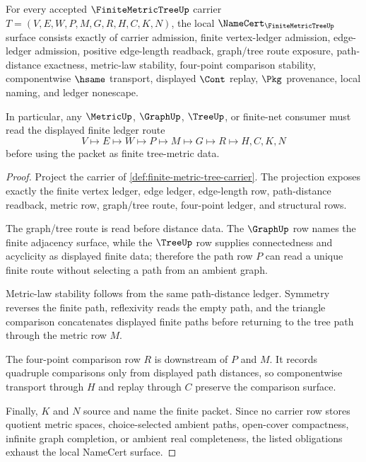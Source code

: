 \begin{theorem}
\label{thm:finite-metric-tree-namecert-obligations}
For every accepted $\FiniteMetricTreeUp$ carrier $T=(V,E,W,P,M,G,R,H,C,K,N)$, the local $\NameCert_{\FiniteMetricTreeUp}$ surface consists exactly of carrier admission, finite vertex-ledger admission, edge-ledger admission, positive edge-length readback, graph/tree route exposure, path-distance exactness, metric-law stability, four-point comparison stability, componentwise $\hsame$ transport, displayed $\Cont$ replay, $\Pkg$ provenance, local naming, and ledger nonescape.

In particular, any $\MetricUp$, $\GraphUp$, $\TreeUp$, or finite-net consumer must read the displayed finite ledger route
$$
V\longmapsto E\longmapsto W\longmapsto P\longmapsto M\longmapsto G\longmapsto R\longmapsto H,C,K,N
$$
before using the packet as finite tree-metric data.
\end{theorem}
\begin{proof}
Project the carrier of \autoref{def:finite-metric-tree-carrier}. The projection exposes exactly the finite vertex ledger, edge ledger, edge-length row, path-distance readback, metric row, graph/tree route, four-point ledger, and structural rows.

The graph/tree route is read before distance data. The $\GraphUp$ row names the finite adjacency surface, while the $\TreeUp$ row supplies connectedness and acyclicity as displayed finite data; therefore the path row $P$ can read a unique finite route without selecting a path from an ambient graph.

Metric-law stability follows from the same path-distance ledger. Symmetry reverses the finite path, reflexivity reads the empty path, and the triangle comparison concatenates displayed finite paths before returning to the tree path through the metric row $M$.

The four-point comparison row $R$ is downstream of $P$ and $M$. It records quadruple comparisons only from displayed path distances, so componentwise transport through $H$ and replay through $C$ preserve the comparison surface.

Finally, $K$ and $N$ source and name the finite packet. Since no carrier row stores quotient metric spaces, choice-selected ambient paths, open-cover compactness, infinite graph completion, or ambient real completeness, the listed obligations exhaust the local NameCert surface.
\end{proof}

